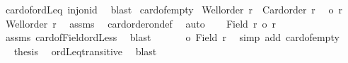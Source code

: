 \begin{isabellebody}
%
\isadelimproof
%
\endisadelimproof
%
\isatagproof
{}\isamarkupfalse%
\ card{\isacharunderscore}{\kern0pt}of{\isacharunderscore}{\kern0pt}ordLeq\ inj{\isacharunderscore}{\kern0pt}on{\isacharunderscore}{\kern0pt}id\ \isamarkupfalse%
\ blast%
\endisatagproof
{\isafoldproof}%
%
\isadelimproof
\isanewline
%
\endisadelimproof
\isanewline
{}\isamarkupfalse%
\ card{\isacharunderscore}{\kern0pt}of{\isacharunderscore}{\kern0pt}empty{}{\isacharcolon}{\kern0pt}\isanewline
{}\ {\isachardoublequoteopen}Well{\isacharunderscore}{\kern0pt}order\ r\ {\isasymor}\ Card{\isacharunderscore}{\kern0pt}order\ r{\isachardoublequoteclose}\isanewline
{}\ {\isachardoublequoteopen}{\isacharbar}{\kern0pt}{\isacharbraceleft}{\kern0pt}{\isacharbraceright}{\kern0pt}{\isacharbar}{\kern0pt}\ {\isasymle}o\ r{\isachardoublequoteclose}\isanewline
%
\isadelimproof
%
\endisadelimproof
%
\isatagproof
{}\isamarkupfalse%
{\isacharminus}{\kern0pt}\isanewline
\ \ \isamarkupfalse%
\ {\isachardoublequoteopen}Well{\isacharunderscore}{\kern0pt}order\ r{\isachardoublequoteclose}\ \isamarkupfalse%
\ assms\ \isamarkupfalse%
\ card{\isacharunderscore}{\kern0pt}order{\isacharunderscore}{\kern0pt}on{\isacharunderscore}{\kern0pt}def\ \isamarkupfalse%
\ auto\isanewline
\ \ \isamarkupfalse%
\ {\isachardoublequoteopen}{\isacharbar}{\kern0pt}Field\ r{\isacharbar}{\kern0pt}\ {\isacharless}{\kern0pt}{\isacharequal}{\kern0pt}o\ r{\isachardoublequoteclose}\isanewline
\ \ \isamarkupfalse%
\ assms\ card{\isacharunderscore}{\kern0pt}of{\isacharunderscore}{\kern0pt}Field{\isacharunderscore}{\kern0pt}ordLess\ \isamarkupfalse%
\ blast\isanewline
\ \ \isamarkupfalse%
\ \isamarkupfalse%
\ {\isachardoublequoteopen}{\isacharbar}{\kern0pt}{\isacharbraceleft}{\kern0pt}{\isacharbraceright}{\kern0pt}{\isacharbar}{\kern0pt}\ {\isasymle}o\ {\isacharbar}{\kern0pt}Field\ r{\isacharbar}{\kern0pt}{\isachardoublequoteclose}\ \isamarkupfalse%
\ {\isacharparenleft}{\kern0pt}simp\ add{\isacharcolon}{\kern0pt}\ card{\isacharunderscore}{\kern0pt}of{\isacharunderscore}{\kern0pt}empty{\isacharparenright}{\kern0pt}\isanewline
\ \ \isamarkupfalse%
\ \isamarkupfalse%
\ {\isacharquery}{\kern0pt}thesis\ \isamarkupfalse%
\ ordLeq{\isacharunderscore}{\kern0pt}transitive\ \isamarkupfalse%
\ blast\isanewline

\end{isabellebody}
